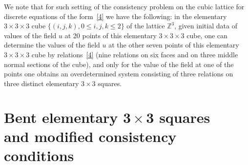 We note that for such setting of the consistency problem on the
cubic lattice for discrete equations of the form~\eqref{4} we have
the following: in the elementary $3 \times 3 \times 3$ cube $\{(i,
j, k), 0 \leq i, j, k \leq 2 \}$ of the lattice $\mathbb{Z}^3$,
given initial data of values of the f\/ield $u$ at 20 points of this
elementary $3 \times 3 \times 3$ cube, one can determine the values
of the f\/ield $u$ at the other seven points of this elementary $3
\times 3 \times 3$ cube by relations~\eqref{4} (nine relations on
six faces and on three middle normal sections of the cube), and only
for the value of the f\/ield at one of the points one obtains an
overdetermined system consisting of three relations on three
distinct elementary $3 \times 3$ squares.




\section[Bent elementary $3 \times 3$ squares
and modified consistency conditions]{Bent elementary $\boldsymbol{3 \times 3}$ squares\\
and modif\/ied consistency conditions}



